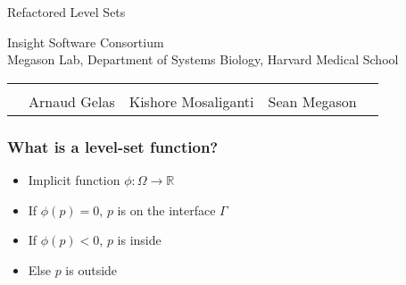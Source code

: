 {
\color{white}
\begin{frame}[plain]
\fontsize{36pt}{36pt}\selectfont
\center
\begin{center}
Refactored Level Sets
\newline
\end{center}

\fontsize{12pt}{12pt}\selectfont
Insight Software Consortium\\
Megason Lab, Department of Systems Biology, Harvard Medical School
\newline
\begin{tabular}{cp{}p{}p{}c}
\\
\\
&
\centering{}Arnaud Gelas &
\centering{}Kishore Mosaliganti &
\centering{}Sean Megason & \\
\end{tabular}
\end{frame}
}



\begin{frame}
\frametitle{What is a level-set function?}
\begin{itemize}
\item Implicit function $\phi : \Omega \rightarrow \mathbb{R}$
\item If $\phi(p) = 0$, $p$ is on the interface $\Gamma$
\item If $\phi(p) < 0$, $p$ is inside
\item Else $p$ is outside
\end{itemize}
\end{frame}


